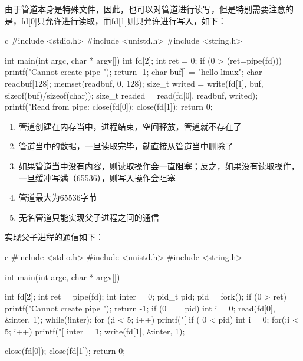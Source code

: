 由于管道本身是特殊文件，因此，也可以对管道进行读写，但是特别需要注意的是，fd[0]只允许进行读取，而fd[1]则只允许进行写入，如下：
\begin{code-block}{c}
#include <stdio.h>
#include <unistd.h>
#include <string.h>

int main(int argc, char * argv[])
{
        int fd[2];
        int ret = 0;
        if (0 > (ret=pipe(fd)))
        {
                printf("Cannot create pipe \n");
                return -1;
        }
        char buf[] = "hello linux";
        char readbuf[128];
        memset(readbuf, 0, 128);
        size_t writed = write(fd[1], buf, sizeof(buf)/sizeof(char));
        size_t readed = read(fd[0], readbuf, writed);
        printf("Read from pipe: %
        close(fd[0]);
        close(fd[1]);
        return 0;
}
\end{code-block}

\begin{enumerate}
  \item 管道创建在内存当中，进程结束，空间释放，管道就不存在了
  \item 管道当中的数据，一旦读取完毕，就直接从管道当中删除了
  \item 如果管道当中没有内容，则读取操作会一直阻塞；反之，如果没有读取操作，一旦缓冲写满（65536），则写入操作会阻塞
  \item 管道最大为65536字节
  \item 无名管道只能实现父子进程之间的通信
\end{enumerate}

实现父子进程的通信如下：
\begin{code-block}{c}
#include <stdio.h>
#include <unistd.h>
#include <string.h>

int main(int argc, char * argv[])
{
        int fd[2];
        int ret = pipe(fd);
        int inter = 0;
        pid_t pid;
        pid = fork();
        if (0 > ret)
        {
                printf("Cannot create pipe \n");
                return -1;
        }
        if (0 == pid)
        {
                int i = 0;
                read(fd[0], &inter, 1);
                while(!inter);
                for (;i < 5; i++)
                {
                        printf("[%
                }
        }
        if ( 0 < pid)
        {
                int i = 0;
                for(;i < 5; i++)
                {
                        printf("[%
                }
                inter = 1;
                write(fd[1], &inter, 1);
        }

        close(fd[0]);
        close(fd[1]);
        return 0;
}
\end{code-block}

